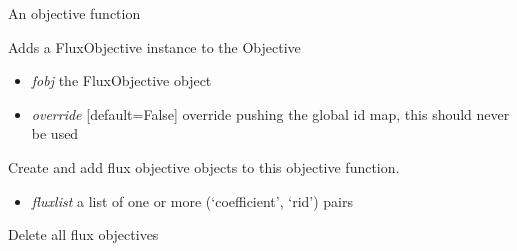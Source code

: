 \documentclass[a4paper,11pt,english]{sphinxmanual}
\begin{document}
\begin{fulllineitems}
\label{modules_doc:cbmpy.CBModel.Objective}
An objective function

\begin{fulllineitems}
\label{modules_doc:cbmpy.CBModel.Objective.addFluxObjective}
Adds a FluxObjective instance to the Objective
\begin{itemize}
\item {} 
\emph{fobj} the FluxObjective object

\item {} 
\emph{override} {[}default=False{]} override pushing the global id map, this should never be used

\end{itemize}

\end{fulllineitems}


\begin{fulllineitems}
\label{modules_doc:cbmpy.CBModel.Objective.createFluxObjectives}
Create and add flux objective objects to this objective function.
\begin{itemize}
\item {} 
\emph{fluxlist} a list of one or more (`coefficient', `rid') pairs

\end{itemize}

\end{fulllineitems}


\begin{fulllineitems}
\label{modules_doc:cbmpy.CBModel.Objective.deleteAllFluxObjectives}
Delete all flux objectives

\end{fulllineitems}



\end{fulllineitems}
\end{document}
